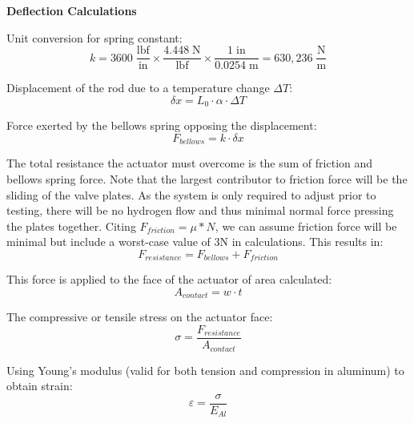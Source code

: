 \documentclass[12pt, letterpaper]{report}%
\begin{document}
\noindent\textbf{Deflection Calculations}

\vspace{1em}
Unit conversion for spring constant:
\begin{equation}
    k = 3600\;\frac{\text{lbf}}{\text{in}}
      \times \frac{4.448\;\text{N}}{\text{lbf}}
      \times \frac{1\;\text{in}}{0.0254\;\text{m}}
      = 630{,}236\;\frac{\text{N}}{\text{m}}
\end{equation}



Displacement of the rod due to a temperature change $\Delta T$:
\begin{equation}
    \delta x = L_0 \cdot \alpha \cdot \Delta T
\end{equation}

Force exerted by the bellows spring opposing the displacement:
\begin{equation}
    F_{bellows} = k \cdot \delta x
\end{equation}

The total resistance the actuator must overcome is the sum of friction and bellows spring force.
Note that the largest contributor to friction force will be the sliding of the valve plates. As
the system is only required to adjust prior to testing, there will be no hydrogen flow and thus minimal
normal force pressing the plates together. Citing $F_{friction} = \mu*N $, we can assume friction force
will be minimal but include a worst-case value of 3N in calculations. This results in:
\begin{equation}
    F_{resistance} = F_{bellows} + F_{friction}
\end{equation}

This force is applied to the face of the actuator of area calculated:
\begin{equation}
    A_{contact} = w \cdot t
\end{equation}

The compressive or tensile stress on the actuator face:
\begin{equation}
    \sigma = \frac{F_{resistance}}{A_{contact}}
\end{equation}

Using Young's modulus (valid for both tension and compression in aluminum) to obtain strain:
\begin{equation}
    \varepsilon = \frac{\sigma}{E_{Al}}
\end{equation}
\end{document}
